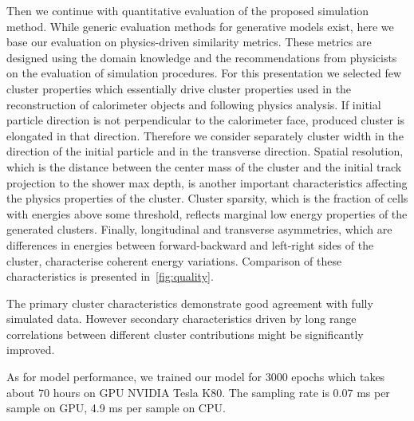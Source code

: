 Then we continue with quantitative evaluation of the proposed simulation
method. While generic evaluation methods for generative models exist,
here we base our evaluation on physics-driven similarity
metrics. These metrics are designed using the domain knowledge and the
recommendations from physicists on the evaluation of simulation
procedures. 
For this presentation we selected few cluster properties which essentially
drive cluster properties used in the reconstruction of calorimeter objects
and following physics analysis. If initial particle direction is not
perpendicular to the calorimeter face, produced cluster is elongated
in that direction. Therefore we consider separately cluster width in
the direction of the initial particle and in the transverse
direction. Spatial resolution, which is the distance between the center
mass of the cluster and the initial track projection to the shower max
depth, is another important characteristics affecting the physics
properties of the cluster. Cluster sparsity, which is the fraction of
cells with energies above some threshold, reflects marginal low
energy properties of the generated clusters. Finally, longitudinal and
transverse asymmetries, which are differences in energies between
forward-backward and left-right sides of the cluster, characterise
coherent energy variations.  
 Comparison of these  characteristics is presented in~\cref{fig:quality}. 

The primary cluster characteristics  demonstrate good agreement with
fully simulated data. However secondary characteristics driven by
long range correlations between different cluster contributions might
be significantly improved.  




As for model performance, we trained our model for 3000 epochs which takes about 70 hours on GPU NVIDIA Tesla K80. The sampling rate is 0.07 ms per sample on GPU, 4.9 ms per sample on CPU.
